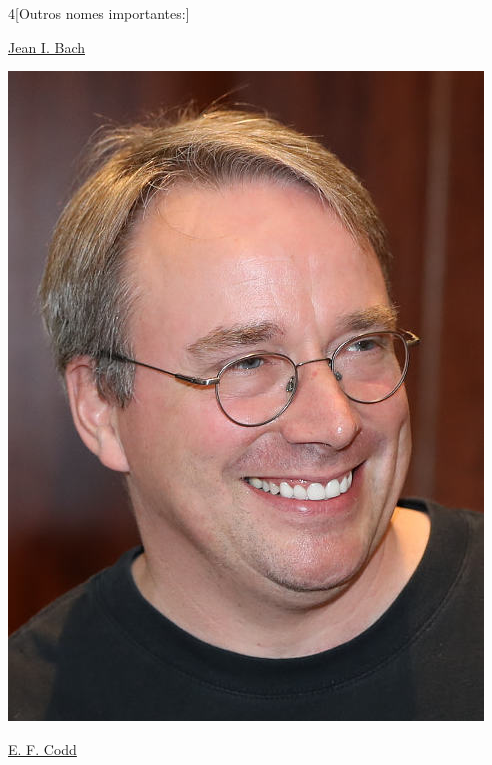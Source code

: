 \begin{multicols}{4}[Outros nomes importantes:]
\vfill\null
\columnbreak				
				
				\href{https://pt.wikipedia.org/wiki/Jean_I._Bach}{Jean I. Bach}
				
\begin{center}
					\includegraphics[width=.8\columnwidth]{./IMG-GIT/CIENTISTAS/linus.jpeg}
\end{center}
				
\vfill\null
\columnbreak				
				
				\href{https://pt.wikipedia.org/wiki/E._F._Codd}{E. F. Codd}
				

\end{multicols}
